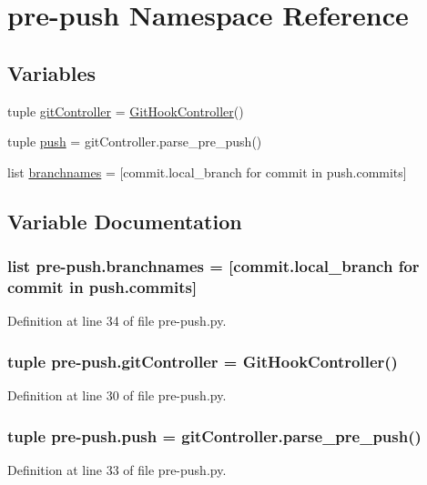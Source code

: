 \section{pre-\/push Namespace Reference}
\label{namespacepre-push}
\subsection*{Variables}
\begin{DoxyCompactItemize}
\item 
tuple \hyperlink{namespacepre-push_a8c127aba641727d65b14a0f4aad44a1c}{git\-Controller} = \hyperlink{classgithookcontroller_1_1GitHookController}{Git\-Hook\-Controller}()
\item 
tuple \hyperlink{namespacepre-push_a71bb0fe33ffeefadee67d3dbbe085080}{push} = git\-Controller.\-parse\-\_\-pre\-\_\-push()
\item 
list \hyperlink{namespacepre-push_a78ac8288356df9910db91d02884f211c}{branchnames} = \mbox{[}commit.\-local\-\_\-branch for commit in push.\-commits\mbox{]}
\end{DoxyCompactItemize}


\subsection{Variable Documentation}
\subsubsection[{branchnames}]{\setlength{\rightskip}{0pt plus 5cm}list pre-\/push.\-branchnames = \mbox{[}commit.\-local\-\_\-branch for commit in push.\-commits\mbox{]}}\label{namespacepre-push_a78ac8288356df9910db91d02884f211c}


Definition at line 34 of file pre-\/push.\-py.

\subsubsection[{git\-Controller}]{\setlength{\rightskip}{0pt plus 5cm}tuple pre-\/push.\-git\-Controller = {\bf Git\-Hook\-Controller}()}\label{namespacepre-push_a8c127aba641727d65b14a0f4aad44a1c}


Definition at line 30 of file pre-\/push.\-py.

\subsubsection[{push}]{\setlength{\rightskip}{0pt plus 5cm}tuple pre-\/push.\-push = git\-Controller.\-parse\-\_\-pre\-\_\-push()}\label{namespacepre-push_a71bb0fe33ffeefadee67d3dbbe085080}


Definition at line 33 of file pre-\/push.\-py.

